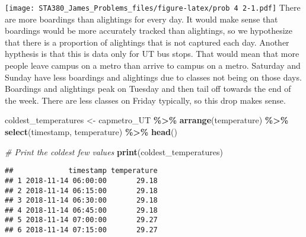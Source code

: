 \documentclass[
]{article}
\newenvironment{Shaded}{\begin{snugshade}}{\end{snugshade}}
\newcommand{\CommentTok}[1]{\textcolor[rgb]{0.56,0.35,0.01}{\textit{#1}}}
\newcommand{\FunctionTok}[1]{\textcolor[rgb]{0.13,0.29,0.53}{\textbf{#1}}}
\newcommand{\NormalTok}[1]{#1}
\newcommand{\OtherTok}[1]{\textcolor[rgb]{0.56,0.35,0.01}{#1}}
\newcommand{\SpecialCharTok}[1]{\textcolor[rgb]{0.81,0.36,0.00}{\textbf{#1}}}
\begin{document}
\texttt{[image: STA380\_James\_Problems\_files/figure-latex/prob 4 2-1.pdf]}
There are more boardings than alightings for every day. It would make
sense that boardings would be more accurately tracked than alightings,
so we hypothesize that there is a proportion of alightings that is not
captured each day. Another hypthesis is that this is data only for UT
bus stops. That would mean that more people leave campus on a metro than
arrive to campus on a metro. Saturday and Sunday have less boardings and
alightings due to classes not being on those days. Boardings and
alightings peak on Tuesday and then tail off towards the end of the
week. There are less classes on Friday typically, so this drop makes
sense.

\begin{Shaded}
\begin{Highlighting}[]
\NormalTok{coldest\_temperatures }\OtherTok{\textless{}{-}}\NormalTok{ capmetro\_UT }\SpecialCharTok{\%\textgreater{}\%}
  \FunctionTok{arrange}\NormalTok{(temperature) }\SpecialCharTok{\%\textgreater{}\%}
  \FunctionTok{select}\NormalTok{(timestamp, temperature) }\SpecialCharTok{\%\textgreater{}\%}
  \FunctionTok{head}\NormalTok{()}

\CommentTok{\# Print the coldest few values}
\FunctionTok{print}\NormalTok{(coldest\_temperatures)}
\end{Highlighting}
\end{Shaded}

\begin{verbatim}
##             timestamp temperature
## 1 2018-11-14 06:00:00       29.18
## 2 2018-11-14 06:15:00       29.18
## 3 2018-11-14 06:30:00       29.18
## 4 2018-11-14 06:45:00       29.18
## 5 2018-11-14 07:00:00       29.27
## 6 2018-11-14 07:15:00       29.27
\end{verbatim}
\end{document}
